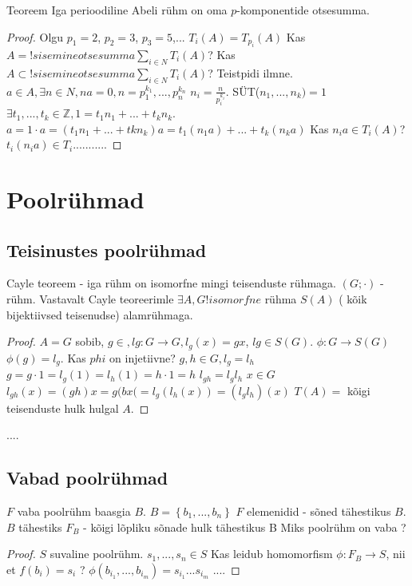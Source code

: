\documentclass[12pt]{report}
\numberwithin{equation}{section}
\theoremstyle{definition}
\theoremstyle{plain}
\begin{document}
Teoreem Iga perioodiline Abeli r\"uhm on oma $p$-komponentide otsesumma. 

\begin{proof}
Olgu $p_1 = 2$, $p_2 = 3$, $p_3 = 5$,...
$T_i(A) = T_{p_i}(A)$
Kas $A = !sisemineotsesumma \sum \limits_{i \in N} T_i (A)$?
Kas $A \subset !sisemineotsesumma \sum \limits_{i \in N} T_i (A)$? Teistpidi ilmne.
$a \in A, \exists n \in N, na = 0, n = p_1^{k_1},...,p_n^{k_n}$
$n_i = \frac{n}{p_i^{k_i}}$.
S\"UT($n_1,...,n_k) = 1$
$\exists t_1,...,t_k \in \mathbb{Z}, 1 = t_1 n_1 +...+ t_k n_k$.
$a = 1 \cdot a = ( t_1 n_1 +...+ tk n_k)a = t_1 (n_1 a) + ... + t_k (n_k a) $
Kas $n_i a \in T_i (A)$?
$t_i (n_i a) \in T_i$...........
 \end{proof}

\section{Poolr\"uhmad}

\subsection{Teisinustes poolr\"uhmad}
Cayle teoreem - iga r\"uhm on isomorfne mingi teisenduste r\"uhmaga.
$(G; \cdot)$ - r\"uhm.
Vastavalt Cayle teoreerimle $\exists A, G !isomorfne $ r\"uhma $S(A) $ ( kõik bijektiivsed teisenudse) alamr\"uhmaga. 
\begin{proof}
$A = G$ sobib, $g \in , lg : G \to G, l_g (x) = gx$, $lg \in S(G)$. 
$\phi: G \to S(G)$
$\phi(g) = l_g$.
Kas $phi$ on injetiivne? 
$g,h \in G, l_g = l_h$
$g = g \cdot 1 = l_g(1) = l_h (1) = h \cdot 1 = h$
$l_{gh} = l_g l_h$
$x \in G$
$l_{gh}(x) = (gh)x = g(bx( = l_g(l_h(x)) = (l_g l_h)(x)$
$T(A) =$ kõigi teisenduste hulk hulgal $A$.
\end{proof}
....
\subsection{Vabad poolr\"uhmad}
$F$ vaba poolr\"uhm baasgia $B$.
$B = \left\lbrace b_1,...,b_n \right\rbrace$
$F$ elemenidid - sõned tähestikus $B$.
$B$ tähestiks
$F_B$ - kõigi lõpliku sõnade hulk tähestikus B
Miks poolr\"uhm on vaba ?
\begin{proof}
$S$ suvaline poolr\"uhm.
$s_1,...,s_n \in S$
Kas leidub homomorfism $\phi: F_B \to S$, nii et $f(b_i) = s_i$ ?
$\phi(b_{i_1},...,b_{i_m}) = s_{i_1}...s_{i_m}$
....

\end{proof}
\end{document}
